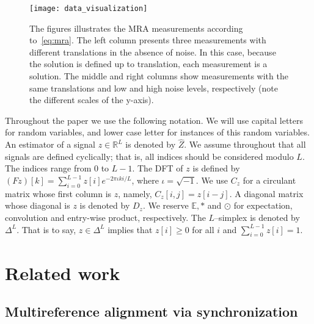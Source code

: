 \documentclass{IEEEtran}
\numberwithin{equation}{section}
\numberwithin{figure}{section}
\theoremstyle{plain}
\theoremstyle{definition}
\theoremstyle{remark}
\theoremstyle{plain}
\theoremstyle{remark}
\theoremstyle{plain}
\theoremstyle{plain}
\theoremstyle{remark}
\newcommand{\RL}{\mathbb{R}^L}
\newcommand{\E}{\mathbb{E}}
\newcommand{\F}{F}
\begin{document}
\begin{figure}     
    \centering    
    \texttt{[image: data\_visualization]}
    \protect    
    \caption{\label{fig:intro} The figures illustrates the MRA 
        measurements according to~\eqref{eq:mra}. The left column presents three measurements with different translations in the absence of noise. In this case, because the solution is defined up to translation, each measurement is a solution. The middle and right columns show measurements with the same translations and low and high noise levels, respectively (note the different scales of the y-axis).}
\end{figure}


Throughout the paper we use the following notation. We will use capital letters for random variables, and lower case letter for instances of this random variables. An estimator of a signal $z\in\RL$ is denoted by $\widehat{Z}$. We assume throughout that all signals are defined cyclically; that is, all indices should be considered modulo $L$. The indices range from $0$ to $L-1$. The DFT of $z$ is defined by $(\F z)[k] = \sum_{i=0}^{L-1}z[i] e^{-2\pi \iota k i /L}$, where $\iota=\sqrt{-1}$. We use $C_z$ for a circulant matrix whose first column is $z$, namely, $C_z[i,j] = z[i-j]$. A diagonal matrix whose diagonal is $z$ is denoted by $D_z$. We reserve $\E, \ast$ and $\odot$ for expectation, convolution and entry-wise product, respectively. The $L$--simplex is denoted by $\Delta^L$. That is to say, $z\in\Delta^L$ implies that $z[i]\geq 0$ for all $i$ and $\sum_{i=0}^{L-1}z[i]=1$.


\section{Related work} \label{sec:related_work}

\subsection{Multireference alignment via synchronization} \label{sec:alignment}
\end{document}
